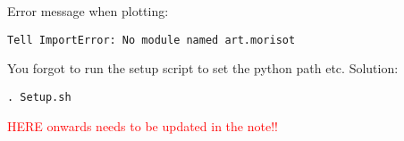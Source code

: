 \documentclass[UKenglish]{latex/atlasdoc}
\begin{document}
Error message when plotting: 
\begin{lstlisting}[breaklines]
Tell ImportError: No module named art.morisot
\end{lstlisting}
You forgot to run the setup script to set the python path etc. Solution:
\begin{lstlisting}[breaklines]
. Setup.sh
\end{lstlisting}

\textcolor{red}{HERE onwards needs to be updated in the note!!}


\end{document}
